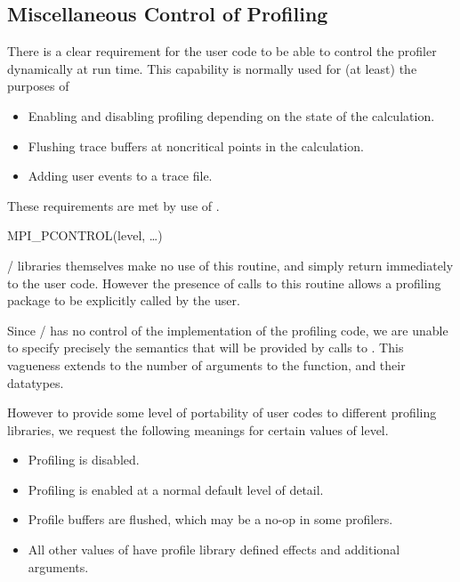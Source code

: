 \subsection{Miscellaneous Control of Profiling}

There is a clear requirement for the user code to be able to control the
profiler dynamically at run time.  This capability is normally used for (at
least) the purposes of
\begin{itemize}
\item Enabling and disabling profiling depending on the state of the
  calculation.
\item Flushing trace buffers at noncritical points in the calculation.
\item Adding user events to a trace file.
\end{itemize}
These requirements are met by use of .

\begin{funcdef}{MPI\_PCONTROL}{(\mbox{level}, \mbox{\ldots})}
\end{funcdef}

\MPI/ libraries themselves make no use of this routine, and simply return
immediately to the user code.  However the presence of calls to this
routine allows a profiling package to be explicitly called by the user.

Since \MPI/ has no control of the implementation of the profiling code, we
are unable to specify precisely the semantics that  will be provided by
calls to .  This vagueness extends to the number of
arguments to the function, and their datatypes.

However to provide some level of portability of user codes to different
profiling libraries, we request the following meanings for certain values
of level.
\begin{itemize}
\item{}
  Profiling is disabled.
\item{}
  Profiling is enabled at a normal default level of detail.
\item{}
  Profile buffers are flushed, which may be a no-op in some profilers.
\item{All other values of }
  have profile library defined effects and additional arguments.
\end{itemize}

